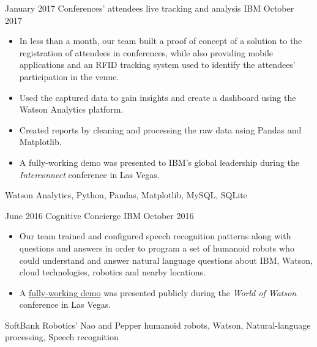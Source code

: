 \begin{projects}
    \project
        {January 2017}
        {Conferences' attendees live tracking and analysis}
        {IBM}
        {October 2017}
        {
            \begin{itemize}
                \item In less than a month, our team built a proof of concept 
                    of a solution to the registration of attendees in 
                    conferences, while also providing mobile applications and 
                    an RFID tracking system used to identify the attendees' 
                    participation in the venue.
                \item Used the captured data to gain insights and create a 
                    dashboard using the Watson Analytics platform.
                \item Created reports by cleaning and processing the raw data 
                    using Pandas and Matplotlib.
                \item A fully-working demo was presented to IBM's global 
                    leadership during the \textit{Interconnect} conference in 
                    Las Vegas.
            \end{itemize}
        }
        {
            Watson Analytics,
            Python,
            Pandas,
            Matplotlib,
            MySQL,
            SQLite
        }

    \emptySeparator


    \project
        {June 2016}
        {Cognitive Concierge}
        {IBM}
        {October 2016}
        {
            \begin{itemize}
                \item Our team trained and configured speech recognition 
                    patterns along with questions and answers in order to 
                    program a set of humanoid robots who could understand and 
                    answer natural language questions about IBM, Watson, cloud 
                    technologies, robotics and nearby locations.
                \item A \href{https://www.youtube.com/watch?v=yC0EOEdedzQ}
                    {\underline{fully-working demo}} was presented publicly 
                    during the \textit{World of Watson} conference in Las Vegas.
            \end{itemize}
        }
        {
            SoftBank Robotics' Nao and Pepper humanoid robots,
            Watson,
            Natural-language processing,
            Speech recognition
        }


\end{projects}
